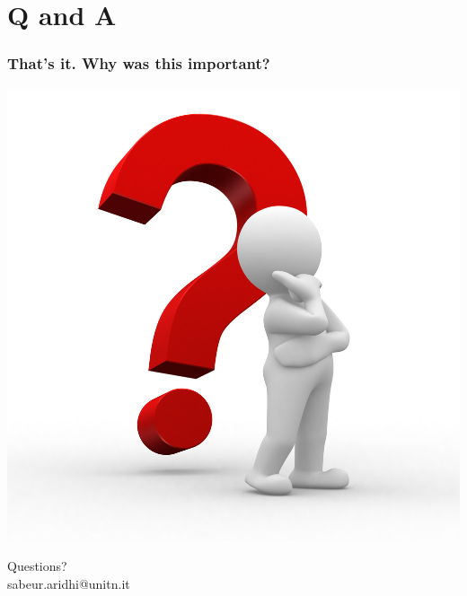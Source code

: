 \section{Q and A}
\begin{frame}
 \frametitle{That's it. Why was this important?}
 \begin{center}
 
 \includegraphics[keepaspectratio=true,scale=0.45]{figs/12/questions}

\footnotesize Questions?\\
sabeur.aridhi@unitn.it
 \end{center}
\end{frame}
\note{}


